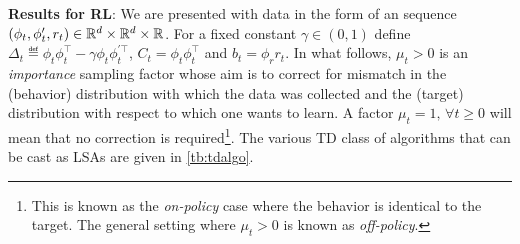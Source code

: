 \textbf{Results for RL}: We are presented with data in the form of an \iid sequence $(\phi_t,\phi'_t,r_t)\in \mathbb{R}^d\times\mathbb{R}^d\times \mathbb{R}$. For a fixed constant $\gamma \in (0,1)$ define  $\Delta_t\eqdef \phi_t\phi_t^\top-\gamma \phi_t\phi_t^{'\top}$, $C_t=\phi_t\phi_t^\top$ and $b_t=\phi_r r_t$. In what follows, $\mu_t>0$ is an \emph{importance} sampling factor whose aim is to correct for mismatch in the (behavior) distribution with which the data was collected and the (target) distribution with respect to which one wants to learn. A factor $\mu_t=1,\,\forall t\geq 0$ will mean that no correction is required\footnote{This is known as the \emph{on-policy} case where the behavior is identical to the target. The general setting where $\mu_t>0$ is known as \emph{off-policy}.}. The various TD class of algorithms that can be cast as LSAs are given in \cref{tb:tdalgo}.
\FloatBarrier
\begin{table}[h]
\caption{Rates for TD algorithms available in the literature \cite{korda-prashanth,gtdmp,gtd2}. }
\label{tb:tdalgo}
\end{table}
